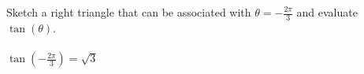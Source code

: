 {Sketch a right triangle that can be associated with $\theta = -\frac{2\pi}{3}$ and evaluate $\tan{(\theta)}$.}
{\text{}\\ \label{fig:03_05_ex_12}\\
$\tan{(-\frac{2\pi}{3})} = \sqrt{3}$}
